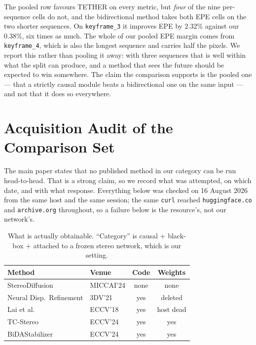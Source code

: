 \documentclass[letterpaper,10pt,conference]{ieeeconf}
\begin{document}
The pooled row favours TETHER on every metric, but \emph{four} of the nine
per-sequence cells do not, and the bidirectional method takes both EPE cells
on the two shorter sequences. On \texttt{keyframe\_3} it improves EPE by
$2.32\%$ against our $0.38\%$, six times as much. The whole of our pooled EPE
margin comes from \texttt{keyframe\_4}, which is also the longest sequence and
carries half the pixels. We report this rather than pooling it away: with
three sequences that is well within what the split can produce, and a method
that sees the future should be expected to win somewhere. The claim the
comparison supports is the pooled one --- that a strictly causal module beats
a bidirectional one on the same input --- and not that it does so everywhere.

\section{Acquisition Audit of the Comparison Set}
\label{sec:acq}

The main paper states that no published method in our category can be run
head-to-head. That is a strong claim, so we record what was attempted, on
which date, and with what response. Everything below was checked on
16 August 2026 from the same host and the same session; the same
\texttt{curl} reached \texttt{huggingface.co} and \texttt{archive.org}
throughout, so a failure below is the resource's, not our network's.

\begin{table}[!htb]
\centering
\caption{What is actually obtainable. ``Category'' is causal $+$ black-box
$+$ attached to a frozen stereo network, which is our setting.}
\label{tab:acquisition}
\setlength{\tabcolsep}{3pt}
\footnotesize
\begin{tabular}{@{}llcc@{}}
\toprule
Method & Venue & Code & Weights \\
\midrule
StereoDiffusion \cite{xu2024stereodiffusion} & MICCAI'24 & none & none \\
Neural Disp.\ Refinement \cite{aleotti2021ndr} & 3DV'21 & yes & deleted \\
Lai et al. \cite{lai2018blind} & ECCV'18 & yes & host dead \\
TC-Stereo \cite{zeng2024tcstereo} & ECCV'24 & yes & yes \\
BiDAStabilizer \cite{jing2024bida} & ECCV'24 & yes & yes \\
\bottomrule
\end{tabular}
\end{table}
\end{document}
